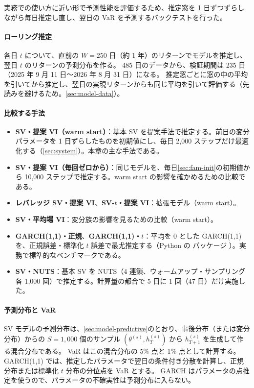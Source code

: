 実務での使い方に近い形で予測性能を評価するため、推定窓を 1 日ずつずらしながら毎日推定し直し、翌日の VaR を予測するバックテストを行った。

\paragraph{ローリング推定}
各日 $t$ について、直前の $W = 250$ 日（約 1 年）のリターンでモデルを推定し、翌日 $t$ のリターンの予測分布を作る。
485 日のデータから、検証期間は 235 日（2025 年 9 月 11 日〜2026 年 8 月 31 日）になる。
推定窓ごとに窓の中の平均を引いてから推定し、翌日の実現リターンからも同じ平均を引いて評価する（先読みを避けるため。\cref{sec:model-data}）。

\paragraph{比較する手法}
\begin{itemize}
  \item \textbf{SV・提案 VI（warm start）}：基本 SV を提案手法で推定する。前日の変分パラメータを 1 日ずらしたものを初期値にし、毎日 2,000 ステップだけ最適化する（\cref{sec:system}）。本章の主な手法である。
  \item \textbf{SV・提案 VI（毎回ゼロから）}：同じモデルを、毎日\cref{sec:fam-init}の初期値から 10,000 ステップで推定する。warm start の影響を確かめるための比較である。
  \item \textbf{レバレッジ SV・提案 VI}、\textbf{SV-$t$・提案 VI}：拡張モデル（warm start）。
  \item \textbf{SV・平均場 VI}：変分族の影響を見るための比較（warm start）。
  \item \textbf{GARCH(1,1)・正規}、\textbf{GARCH(1,1)・$t$}：平均を 0 とした GARCH(1,1) \parencite{bollerslev1986}を、正規誤差・標準化 $t$ 誤差で最尤推定する（Python の  パッケージ \parencite{sheppard_arch}）。実務で標準的なベンチマークである。
  \item \textbf{SV・NUTS}：基本 SV を NUTS（4 連鎖、ウォームアップ・サンプリング各 1,000 回）で推定する。計算量の都合で 5 日に 1 回（47 日）だけ実施した。
\end{itemize}

\paragraph{予測分布と VaR}
SV モデルの予測分布は、\cref{sec:model-predictive}のとおり、事後分布（または変分分布）からの $S = 1{,}000$ 個のサンプル $(\theta^{(s)}, h_T^{(s)})$ から $h_{T+1}^{(s)}$ を生成して作る混合分布である。
VaR はこの混合分布の 5\% 点と 1\% 点として計算する。
GARCH(1,1) では、推定したパラメータで翌日の条件付き分散を計算し、正規分布または標準化 $t$ 分布の分位点を VaR とする。
GARCH はパラメータの点推定を使うので、パラメータの不確実性は予測分布に入らない。


